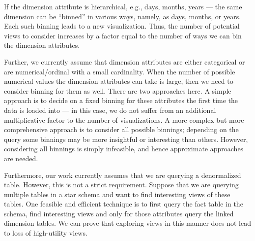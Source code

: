  
 
 
If the dimension attribute is hierarchical, e.g., days, months, years ---
 the same dimension can be ``binned'' in various ways, namely, 
 as days, months, or years. 
 Each such binning leads to a new visualization.
Thus, the number of potential views to consider increases 
by a factor equal to the number of ways we can bin the dimension attributes.

 Further, we currently assume that dimension attributes are either categorical or are
 numerical/ordinal with a small cardinality.
 When the number of possible numerical values the dimension attributes
 can take is large, then we need to consider binning for them as well.
 There are two approaches here. 
  A simple approach is to decide on a fixed binning for these attributes the
 first time the data is loaded into \SeeDB --- in this case, 
 we do not suffer from an additional multiplicative factor to the number of
 visualizations.
 A more complex but more comprehensive approach is to consider all possible binnings;
 depending on the query some binnings may be more insightful or interesting than others. However, considering all binnings is simply infeasible, and hence
 approximate approaches are needed.

 
 Furthermore, our work currently assumes that we are querying a denormalized
 table.
 However, this is not a strict requirement. 
 Suppose that we are querying multiple tables in a star schema and want to find
 interesting views of these tables.
 One feasible and efficient technique is to first query the fact table in the
 schema, find interesting views and only for those attributes query the
 linked dimension tables.
 We can prove that exploring views in this manner does not lead to loss of
 high-utility views.
